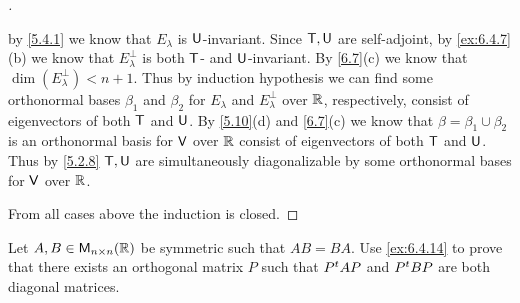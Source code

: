 \begin{proof}[]
\begin{itemize}
          by \cref{5.4.1} we know that \(E_{\lambda}\) is \(\mathsf{U}\)-invariant.
          Since \(\mathsf{T}, \mathsf{U}\) are self-adjoint, by \cref{ex:6.4.7}(b) we know that \(E_{\lambda}^{\perp}\) is both \(\mathsf{T}\)- and \(\mathsf{U}\)-invariant.
          By \cref{6.7}(c) we know that \(\dim(E_{\lambda}^{\perp}) < n + 1\).
          Thus by induction hypothesis we can find some orthonormal bases \(\beta_1\) and \(\beta_2\) for \(E_{\lambda}\) and \(E_{\lambda}^{\perp}\) over \(\mathbb{R}\), respectively, consist of eigenvectors of both \(\mathsf{T}\) and \(\mathsf{U}\).
          By \cref{5.10}(d) and \cref{6.7}(c) we know that \(\beta = \beta_1 \cup \beta_2\) is an orthonormal basis for \(\mathsf{V}\) over \(\mathbb{R}\) consist of eigenvectors of both \(\mathsf{T}\) and \(\mathsf{U}\).
          Thus by \cref{5.2.8} \(\mathsf{T}, \mathsf{U}\) are simultaneously diagonalizable by some orthonormal bases for \(\mathsf{V}\) over \(\mathbb{R}\).
  \end{itemize}
  From all cases above the induction is closed.
\end{proof}

\begin{ex}\label{ex:6.4.15}
  Let \(A, B \in \mathsf{M}_{{n} \times n}({\mathbb{R}})\) be symmetric such that \(AB = BA\).
  Use \cref{ex:6.4.14} to prove that there exists an orthogonal matrix \(P\) such that \({P}^{t} A P\) and \({P}^{t} B P\) are both diagonal matrices.
\end{ex}

